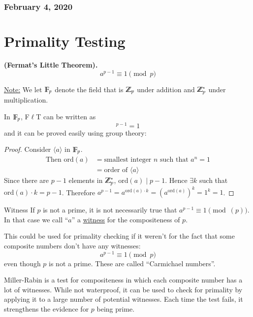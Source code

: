 \subsubsection*{February 4, 2020}
\section{Primality Testing}
\begin{theorem}\textbf{(Fermat's Little Theorem).}
	\begin{equation}
		a^{p-1}\equiv 1\pmod{p}
	\end{equation}
\end{theorem}

\ul{Note:} We let $\mathbb{F}_p$ denote the field that is $\mathbb{Z}_p$ under addition and $\mathbb{Z}_p^*$ under multiplication. 

In $\mathbb{F}_p$, F$\ell$T can be written as
\begin{equation}
	[a]^{p-1}=1
\end{equation}
and it can be proved easily using group theory: 

\begin{proof}
Consider $\langle a\rangle$ in $\mathbb{F}_p$. 
\begin{align*}
	\text{Then }\mathrm{ord}(a) &= \text{smallest integer $n$ such that $a^n=1$} \\
	&= \text{order of $\langle a\rangle$}
\end{align*}
Since there are $p-1$ elements in $\mathbb{Z}_p^*$, $\mathrm{ord}(a)\mid p-1$. Hence $\exists k$ such that $\mathrm{ord}(a)\cdot k=p-1$. Therefore $a^{p-1}=a^{\mathrm{ord}(a)\cdot k}=\left(a^{\mathrm{ord}(a)} \right)^k =1^k = 1$. 
\end{proof}

\begin{defn}{Witness}
	If $p$ is not a prime, it is not necessarily true that $a^{p-1}\equiv 1\pmod(p)$. In that case we call ``$a$'' a \ul{witness} for the compositeness of $p$. 
\end{defn}

This could be used for primality checking if it weren't for the fact that some composite numbers don't have any witnesses: 
\[a^{p-1}\equiv 1\pmod{p}\]
even though $p$ is not a prime. These are called ``Carmichael numbers''. 

Miller-Rabin is a test for compositeness in which each composite number has a lot of witnesses. While not waterproof, it can be used to check for primality by applying it to a large number of potential witnesses. Each time the test fails, it strengthens the evidence for $p$ being prime. 

